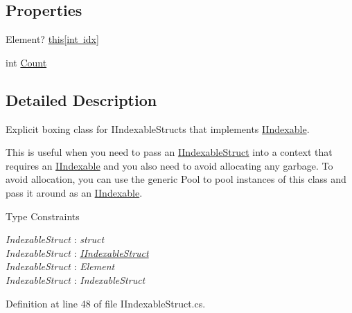 \subsection*{Properties}
\begin{DoxyCompactItemize}
\item 
Element? \mbox{\hyperlink{class_leap_1_1_unity_1_1_boxed_indexable_struct_a36e9c859805dc125dbb8c0a37416a208}{this\mbox{[}int idx\mbox{]}}}
\item 
int \mbox{\hyperlink{class_leap_1_1_unity_1_1_boxed_indexable_struct_a55644e94415a39429a33cb34a94fc673}{Count}}
\end{DoxyCompactItemize}


\subsection{Detailed Description}
Explicit boxing class for I\+Indexable\+Structs that implements \mbox{\hyperlink{interface_leap_1_1_unity_1_1_i_indexable}{I\+Indexable}}. 

This is useful when you need to pass an \mbox{\hyperlink{interface_leap_1_1_unity_1_1_i_indexable_struct}{I\+Indexable\+Struct}} into a context that requires an \mbox{\hyperlink{interface_leap_1_1_unity_1_1_i_indexable}{I\+Indexable}} and you also need to avoid allocating any garbage. To avoid allocation, you can use the generic Pool to pool instances of this class and pass it around as an \mbox{\hyperlink{interface_leap_1_1_unity_1_1_i_indexable}{I\+Indexable}}. \begin{Desc}
\item[Type Constraints]\begin{description}
\item[{\em Indexable\+Struct} : {\em struct}]\item[{\em Indexable\+Struct} : {\em \mbox{\hyperlink{interface_leap_1_1_unity_1_1_i_indexable_struct}{I\+Indexable\+Struct}}}]\item[{\em Indexable\+Struct} : {\em Element}]\item[{\em Indexable\+Struct} : {\em Indexable\+Struct}]\end{description}
\end{Desc}


Definition at line 48 of file I\+Indexable\+Struct.\+cs.



